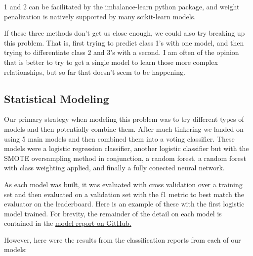 \documentclass[11pt]{article}
\begin{document}
1 and 2 can be facilitated by the imbalance-learn python package, and
weight penalization is natively supported by many scikit-learn models.

If these three methods don't get us close enough, we could also try
breaking up this problem. That is, first trying to predict class 1's
with one model, and then trying to differentiate class 2 and 3's with a
second. I am often of the opinion that is better to try to get a single
model to learn those more complex relationships, but so far that doesn't
seem to be happening.

    \subsection{Statistical Modeling}\label{statistical-modeling}

Our primary strategy when modeling this problem was to try different
types of models and then potentially combine them. After much tinkering
we landed on using 5 main models and then combined them into a voting
classifier. These models were a logistic regression classifier, another
logistic classifier but with the SMOTE oversampling method in
conjunction, a random forest, a random forest with class weighting
applied, and finally a fully conected neural network.

As each model was built, it was evaluated with cross validation over a
training set and then evaluated on a validation set with the f1 metric
to best match the evaluator on the leaderboard. Here is an example of
these with the first logistic model trained. For brevity, the remainder
of the detail on each model is contained in the
\href{https://github.com/mrklees/Data-Science-Capstone/blob/master/Earthquake\%20Damage\%20Model.ipynb}{model
report on GitHub.}

However, here were the results from the classification reports from each
of our models:
\end{document}
